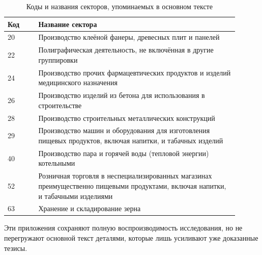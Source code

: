 \begin{table}[htbp]
\centering
\caption{Коды и названия секторов, упоминаемых в основном тексте}
\label{app:sector-code-name-map}
\begin{tabular}{p{0.12\linewidth}p{0.78\linewidth}}
\toprule
Код & Название сектора \\
\midrule
20 & Производство клеёной фанеры, древесных плит и панелей \\
22 & Полиграфическая деятельность, не включённая в другие группировки \\
24 & Производство прочих фармацевтических продуктов и изделий медицинского назначения \\
26 & Производство изделий из бетона для использования в строительстве \\
28 & Производство строительных металлических конструкций \\
29 & Производство машин и оборудования для изготовления пищевых продуктов, включая напитки, и табачных изделий \\
40 & Производство пара и горячей воды (тепловой энергии) котельными \\
52 & Розничная торговля в неспециализированных магазинах преимущественно пищевыми продуктами, включая напитки, и табачными изделиями \\
63 & Хранение и складирование зерна \\
\bottomrule
\end{tabular}
\end{table}

Эти приложения сохраняют полную воспроизводимость исследования, но не перегружают основной текст деталями, которые лишь усиливают уже доказанные тезисы.
